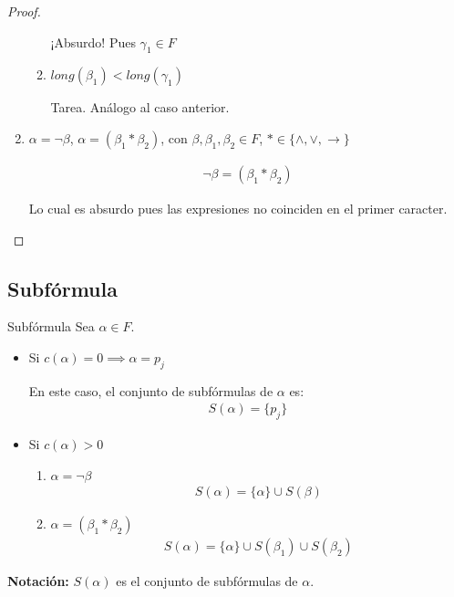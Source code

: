\begin{proof}
\begin{enumerate}
\begin{enumerate}
                    ¡Absurdo!
                    Pues $\gamma_1 \in F$

                \item $long(\beta_1) < long(\gamma_1)$

                    Tarea. Análogo al caso anterior.
            \end{enumerate}

        \item $\alpha = \neg \beta$, $\alpha = (\beta_1 * \beta_2)$, con
            $\beta, \beta_1, \beta_2 \in F$, $*\in \{ \wedge,\vee,\to \}$

            \begin{gather*}
                \neg \beta = (\beta_1 * \beta_2)
            \end{gather*}

            Lo cual es absurdo pues las expresiones no coinciden en el primer
            caracter.
    \end{enumerate}
\end{proof}


\subsection{Subfórmula}

\begin{definicion}{Subfórmula}{}
    Sea $\alpha \in F$.

    \medskip

    \begin{itemize}
        \item {}%
            Si $c(\alpha) = 0 \implies \alpha = p_j $

            En este caso, el conjunto de subfórmulas de $\alpha$ es:
            \begin{gather*}
                S(\alpha)=\{ p_j \}
            \end{gather*}

        \item Si $c(\alpha) > 0$
            \begin{enumerate}
                \item $\alpha = \neg \beta$
                    \begin{gather*}
                        S(\alpha) = \{ \alpha \} \cup S(\beta)
                    \end{gather*}
                \item \nota{$* \in \{ \wedge, \vee, \to \}$}%
                    $\alpha = (\beta_1 * \beta_2)$
                    \begin{gather*}
                        S(\alpha)=\{ \alpha \}\cup S(\beta_1) \cup S(\beta_2)
                    \end{gather*}
            \end{enumerate}
    \end{itemize}

    \bigskip
    \textbf{Notación:}
    $S(\alpha)$ es el conjunto de subfórmulas de $\alpha$.
\end{definicion}

